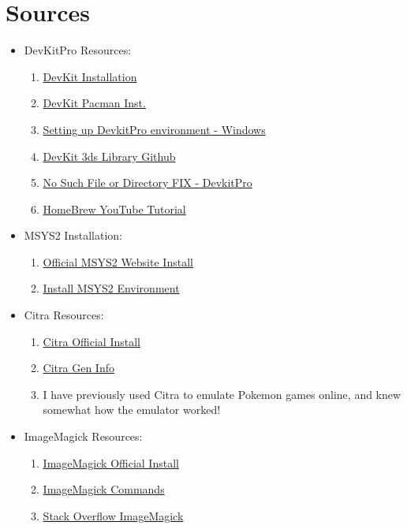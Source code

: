 \documentclass{article}
\begin{document}
\section{Sources}
\begin{itemize}
    \item DevKitPro Resources:
    \begin{enumerate}
        \item \href{https://devkitpro.org/wiki/Getting_Started}{DevKit Installation}
        \item \href{https://devkitpro.org/wiki/devkitPro_pacman}{DevKit Pacman Inst.}
        \item \href{https://gbatemp.net/threads/setup-a-devkitpro-environment-on-windows.652238/}{Setting up DevkitPro environment - Windows}
        \item \href{https://github.com/devkitPro/libctru}{DevKit 3ds Library Github}
        \item \href{https://devkitpro.org/viewtopic.php?t=8997}{No Such File or Directory FIX - DevkitPro}
        \item \href{https://www.youtube.com/watch?v=FNZVHvmGOIE}{HomeBrew YouTube Tutorial}
    \end{enumerate}

    \item MSYS2 Installation:
    \begin{enumerate}
        \item \href{https://www.msys2.org/wiki/MSYS2-installation/}{Official MSYS2 Website Install}
        \item \href{https://gbatemp.net/threads/install-msys-environment.652234/}{Install MSYS2 Environment}
    \end{enumerate}

    \item Citra Resources:
    \begin{enumerate}
        \item \href{https://citra-emulator.com/download/windows/}{Citra Official Install}
        \item \href{https://docs.libretro.com/library/citra/#google_vignette}{Citra Gen Info}
        \item I have previously used Citra to emulate Pokemon games online, and knew somewhat how the emulator worked!
    \end{enumerate}

    \item ImageMagick Resources:
    \begin{enumerate}
        \item\label{immag} \href{https://imagemagick.org/script/download.php}{ImageMagick Official Install}
        \item \href{https://imagemagick.org/script/convert.php}{ImageMagick Commands}
        \item \href{https://stackoverflow.com/questions/29120768/imagemagick-convert-png-16-bit-to-raw}{Stack Overflow ImageMagick}
    \end{enumerate}
\end{itemize}
\end{document}
